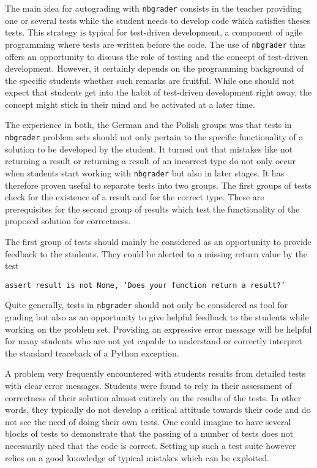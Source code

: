 \documentclass[twocolumn]{svjour3}          %
\begin{document}
The main idea for autograding with \texttt{nbgrader} consists in the teacher
providing one or several tests while the student needs to develop code which
satisfies theses tests. This strategy is typical for test-driven development,
a component of agile programming where tests are written before the code.
The use of \texttt{nbgrader} thus offers an opportunity to discuss the role
of testing and the concept of test-driven development. However, it certainly
depends on the programming background of the specific students whether such
remarks are fruitful. While one should not expect that students get into the
habit of test-driven development right away, the concept might stick in their
mind and be activated at a later time.

The experience in both, the German and the Polish groups was that tests in
\texttt{nbgrader} problem sets should not only pertain to the specific
functionality of a solution to be developed by the student. It turned out
that mistakes like not returning a result or returning a result of an incorrect
type do not only occur when students start working with \texttt{nbgrader} but
also in later stages. It has therefore proven useful to separate tests into
two groups. The first groups of tests check for the existence of a result
and for the correct type. These are prerequisites for the second group of results
which test the functionality of the proposed solution for correctness.

The first group of tests should mainly be considered as an opportunity to
provide feedback to the students. They could be alerted to a missing return
value by the test

\noindent\texttt{assert result is not None, 'Does your function return
a result?'}

Quite generally, tests in \texttt{nbgrader} should not only be considered as
tool for grading but also as an opportunity to give helpful feedback to the
students while working on the problem set. Providing an expressive error
message will be helpful for many students who are not yet capable to understand
or correctly interpret the standard traceback of a Python exception. 

A problem very frequently encountered with students results from detailed 
tests with clear error messages. Students were found to rely in their assessment
of correctness of their solution almost entirely on the results of the tests.
In other words, they typically do not develop a critical attitude towards their
code and do not see the need of doing their own tests. One could imagine to
have several blocks of tests to demonstrate that the passing of a number of
tests does not necessarily need that the code is correct. Setting up such a
test suite however relies on a good knowledge of typical mistakes which can
be exploited.
\end{document}
